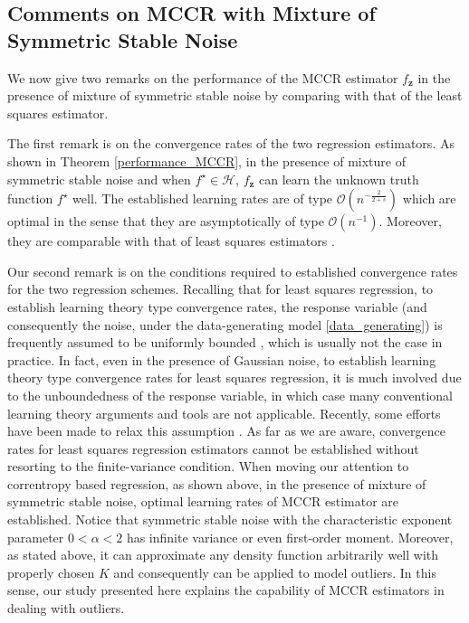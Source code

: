 \documentclass[11pt]{article}
\begin{document}
\subsection{Comments on MCCR with Mixture of Symmetric Stable Noise}
We now give two remarks on the performance of the MCCR estimator $f_\mathbf{z}$ in the presence of mixture of symmetric stable noise by comparing with that of the least squares estimator. 

The first remark is on the convergence rates of the two regression estimators. As shown in Theorem \ref{performance_MCCR}, in the presence of mixture of symmetric stable noise and when $f^\star\in\mathcal{H}$, $f_\mathbf{z}$ can learn the unknown truth function $f^\star$ well. The established learning rates are of   type $\mathcal{O}(n^{-\frac{2}{2+s}})$ which are optimal in the sense that they are asymptotically of type $\mathcal{O}(n^{-1})$. Moreover, they are comparable with that of least squares estimators \cite{wu2006learning,cucker2007learning}.

Our second remark is on the conditions required to established convergence rates for the two regression schemes. Recalling that for least squares regression, to establish learning theory type convergence rates, the response variable (and consequently the noise, under the data-generating model \eqref{data_generating}) is frequently assumed to be uniformly bounded \cite{cucker2007learning,steinwart2008support}, which is usually not the case in practice. In fact, even in the presence of Gaussian noise, to establish learning theory type convergence rates for least squares regression, it is much involved due to the unboundedness of the response variable, in which case many conventional learning theory arguments and tools are not applicable. Recently, some efforts have been made to relax this assumption \cite{wang2011optimal,guo2013concentration,mendelson2015learning}. As far as we are aware, convergence rates for least squares regression estimators cannot be established without resorting to the finite-variance condition. When moving our attention to correntropy based regression, as shown above, in the presence of mixture of symmetric stable noise, optimal learning rates of MCCR estimator are established. Notice that symmetric stable noise with the characteristic exponent parameter $0<\alpha<2$ has infinite variance or even first-order moment. Moreover, as stated above, it can approximate any density function arbitrarily well with properly chosen $K$ and consequently can be applied to model outliers. In this sense, our study presented here explains the capability of MCCR estimators in dealing with outliers.     
\end{document}
